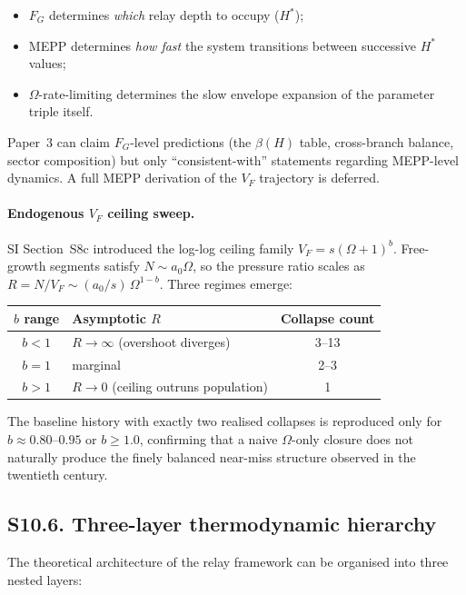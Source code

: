 \documentclass[11pt]{article}
\begin{document}
\begin{itemize}
\item $F_G$ determines \emph{which} relay depth to occupy ($H^*$);
\item MEPP determines \emph{how fast} the system transitions between successive $H^*$ values;
\item $\Omega$-rate-limiting determines the slow envelope expansion of the
parameter triple itself.
\end{itemize}

\noindent
Paper~3 can claim $F_G$-level predictions (the $\beta(H)$ table, cross-branch
balance, sector composition) but only ``consistent-with'' statements regarding
MEPP-level dynamics. A full MEPP derivation of the $V_F$ trajectory is deferred.

\paragraph{Endogenous $V_F$ ceiling sweep.}
SI Section~S8c introduced the log-log ceiling family $V_F = s(\Omega+1)^b$.
Free-growth segments satisfy $N \sim a_0 \Omega$, so the pressure ratio scales as
$R = N/V_F \sim (a_0/s)\,\Omega^{1-b}$. Three regimes emerge:

\begin{center}
\begin{tabular}{clc}
\toprule
$b$ range & Asymptotic $R$ & Collapse count \\
\midrule
$b < 1$ & $R \to \infty$ (overshoot diverges) & 3--13 \\
$b = 1$ & marginal & 2--3 \\
$b > 1$ & $R \to 0$ (ceiling outruns population) & 1 \\
\bottomrule
\end{tabular}
\end{center}

\noindent
The baseline history with exactly two realised collapses is reproduced only for
$b \approx 0.80$--$0.95$ or $b \ge 1.0$, confirming that a naive $\Omega$-only
closure does not naturally produce the finely balanced near-miss structure
observed in the twentieth century.

\subsection*{S10.6. Three-layer thermodynamic hierarchy}

The theoretical architecture of the relay framework can be organised into three
nested layers:
\end{document}
